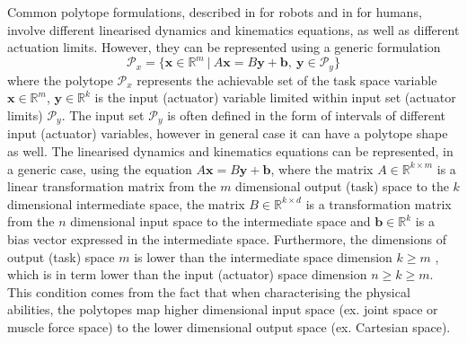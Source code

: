 Common polytope formulations, described in  for robots and in  for humans, involve different linearised dynamics and kinematics equations, as well as different actuation limits. However, they can be represented using a generic formulation
\begin{equation}
    \mathcal{P}_x = \{\bm{x}\in\mathbb{R}^m ~|~ A\bm{x}=B\bm{y} + \bm{b}, ~ \bm{y}\in\mathcal{P}_y\}
    \label{eq:generic_polyt_view}
\end{equation}
where the polytope $\mathcal{P}_x$ represents the achievable set of the task space variable $\bm{x}\in\mathbb{R}^m$, $\bm{y}\in\mathbb{R}^k$ is the input (actuator) variable limited within input set (actuator limits) $\mathcal{P}_y$. The input set $\mathcal{P}_y$ is often defined in the form of intervals of different input (actuator) variables, however in general case it can have a polytope shape as well. The linearised dynamics and kinematics equations can be represented, in a generic case, using the equation $A\bm{x}\!=\!B\bm{y}\!+\!\bm{b}$, where the matrix $A\in\mathbb{R}^{k\times m}$ is a linear transformation matrix from the $m$ dimensional output (task) space to the $k$ dimensional intermediate space, the matrix $B\in\mathbb{R}^{k\times d}$ is a transformation matrix from the $n$ dimensional input space to the intermediate space and $\bm{b}\in\mathbb{R}^k$ is a bias vector expressed in the intermediate space. Furthermore, the dimensions of output (task) space $m$ is lower than the intermediate space dimension $k\!\geq\! m$ , which is in term lower than the input (actuator) space dimension $n\!\geq\! k\!\geq\! m$. This condition comes from the fact that when characterising the physical abilities, the polytopes map higher dimensional input space (ex. joint space or muscle force space) to the lower dimensional output space (ex. Cartesian space).

